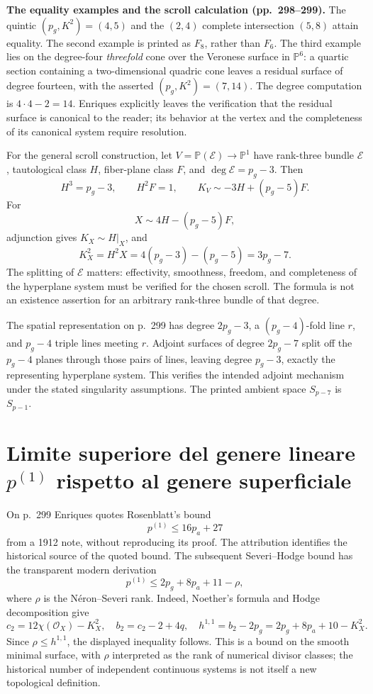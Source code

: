 \textbf{The equality examples and the scroll calculation (pp.~298--299).}
The quintic \((p_g,K^2)=(4,5)\) and the \((2,4)\) complete intersection \((5,8)\) attain equality. The second example is printed as \(F_8\), rather than \(F_6\). The third example lies on the degree-four \emph{threefold} cone over the Veronese surface in \(\mathbb P^6\): a quartic section containing a two-dimensional quadric cone leaves a residual surface of degree fourteen, with the asserted \((p_g,K^2)=(7,14)\). The degree computation is \(4\cdot4-2=14\). Enriques explicitly leaves the verification that the residual surface is canonical to the reader; its behavior at the vertex and the completeness of its canonical system require resolution.

For the general scroll construction, let \(V=\mathbb P(\mathcal E)\to\mathbb P^1\) have rank-three bundle \(\mathcal E\), tautological class \(H\), fiber-plane class \(F\), and \(\deg\mathcal E=p_g-3\). Then
\[
H^3=p_g-3,\qquad H^2F=1,\qquad
K_V\sim-3H+(p_g-5)F.
\]
For
\[
X\sim4H-(p_g-5)F,
\]
adjunction gives \(K_X\sim H|_X\), and
\[
K_X^2=H^2X=4(p_g-3)-(p_g-5)=3p_g-7.
\]
The splitting of \(\mathcal E\) matters: effectivity, smoothness, freedom, and completeness of the hyperplane system must be verified for the chosen scroll. The formula is not an existence assertion for an arbitrary rank-three bundle of that degree.

The spatial representation on p.~299 has degree \(2p_g-3\), a \((p_g-4)\)-fold line \(r\), and \(p_g-4\) triple lines meeting \(r\). Adjoint surfaces of degree \(2p_g-7\) split off the \(p_g-4\) planes through those pairs of lines, leaving degree \(p_g-3\), exactly the representing hyperplane system. This verifies the intended adjoint mechanism under the stated singularity assumptions. The printed ambient space \(S_{p-7}\) is \(S_{p-1}\).

\section{Limite superiore del genere lineare \texorpdfstring{$p^{(1)}$}{p(1)} rispetto al genere superficiale}
\label{cp2-viii-12}

On p.~299 Enriques quotes Rosenblatt's bound
\[
p^{(1)}\leq16p_a+27
\]
from a 1912 note, without reproducing its proof. The attribution identifies the historical source of the quoted bound. The subsequent Severi--Hodge bound has the transparent modern derivation
\[
p^{(1)}\leq2p_g+8p_a+11-\rho,
\]
where \(\rho\) is the Néron--Severi rank. Indeed, Noether's formula and Hodge decomposition give
\[
c_2=12\chi(\mathcal O_X)-K_X^2,\quad
b_2=c_2-2+4q,\quad
h^{1,1}=b_2-2p_g
=2p_g+8p_a+10-K_X^2.
\]
Since \(\rho\leq h^{1,1}\), the displayed inequality follows. This is a bound on the smooth minimal surface, with \(\rho\) interpreted as the rank of numerical divisor classes; the historical number of independent continuous systems is not itself a new topological definition.

